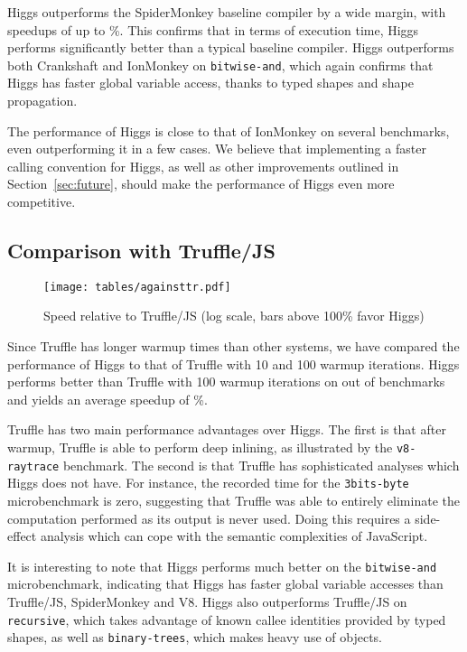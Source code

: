 \documentclass[preprint]{sigplanconf}
\newcommand{\stat}[1]{\unskip}
\newcommand{\percentstat}[1]{\unskip\%}
\begin{document}
Higgs outperforms the SpiderMonkey baseline compiler by a wide margin, with
speedups of up to \percentstat{againstsm_max_sm_baseline}. This confirms that
in terms of execution time, Higgs performs significantly better than a typical
baseline compiler. Higgs outperforms both Crankshaft and IonMonkey on
{\tt bitwise-and}, which again confirms that Higgs has faster global variable
access, thanks to typed shapes and shape propagation.

The performance of Higgs is close to that of IonMonkey on several benchmarks,
even outperforming it in a few cases. We believe that implementing a faster
calling convention for Higgs, as well as other improvements outlined in
Section~\ref{sec:future}, should make the performance of Higgs even more
competitive.

\subsection{Comparison with Truffle/JS}

\begin{figure*}[tb]
    \begin{center}
    \texttt{[image: tables/againsttr.pdf]}
    \end{center}
\caption{Speed relative to Truffle/JS (log scale, bars above 100\% favor Higgs)\label{fig:against_tr}}
\end{figure*}

Since Truffle has longer warmup times than other systems, we have compared
the performance of Higgs to that of Truffle with 10 and 100
warmup iterations. Higgs performs better than Truffle with 100 warmup iterations
on \stat{againsttr_num_above_truffle_100_warmup_itrs}
out of \stat{num_benchs} benchmarks and yields an average speedup of
\percentstat{againsttr_incr_truffle_100_warmup_itrs}.

Truffle has two main performance advantages over Higgs. The first is
that after warmup, Truffle is able to perform deep inlining, as illustrated by
the {\tt v8-raytrace} benchmark. The second is that Truffle has sophisticated
analyses which Higgs does not have. For instance, the recorded time for the
{\tt 3bits-byte} microbenchmark is zero, suggesting that Truffle was able to
entirely eliminate the computation performed as its output is never used. Doing
this requires a side-effect analysis which can cope with the semantic
complexities of JavaScript.

It is interesting to note that Higgs performs much better on the
{\tt bitwise-and} microbenchmark, indicating that Higgs has faster global
variable accesses than Truffle/JS, SpiderMonkey and V8. Higgs also outperforms
Truffle/JS on {\tt recursive}, which takes advantage of known callee
identities provided by typed shapes, as well as {\tt binary-trees}, which
makes heavy use of objects.
\end{document}
